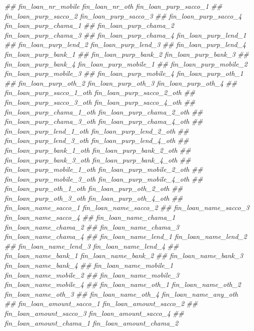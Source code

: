 \documentclass[
]{article}
\newenvironment{Shaded}{\begin{snugshade}}{\end{snugshade}}
\newcommand{\CommentTok}[1]{\textcolor[rgb]{0.56,0.35,0.01}{\textit{#1}}}
\begin{document}
\begin{Shaded}
\begin{Highlighting}[]
\CommentTok{##      fin_loan_nr_mobile fin_loan_nr_oth fin_loan_purp_sacco_1}
\CommentTok{##      fin_loan_purp_sacco_2 fin_loan_purp_sacco_3}
\CommentTok{##      fin_loan_purp_sacco_4 fin_loan_purp_chama_1}
\CommentTok{##      fin_loan_purp_chama_2 fin_loan_purp_chama_3}
\CommentTok{##      fin_loan_purp_chama_4 fin_loan_purp_lend_1}
\CommentTok{##      fin_loan_purp_lend_2 fin_loan_purp_lend_3}
\CommentTok{##      fin_loan_purp_lend_4 fin_loan_purp_bank_1}
\CommentTok{##      fin_loan_purp_bank_2 fin_loan_purp_bank_3}
\CommentTok{##      fin_loan_purp_bank_4 fin_loan_purp_mobile_1}
\CommentTok{##      fin_loan_purp_mobile_2 fin_loan_purp_mobile_3}
\CommentTok{##      fin_loan_purp_mobile_4 fin_loan_purp_oth_1}
\CommentTok{##      fin_loan_purp_oth_2 fin_loan_purp_oth_3 fin_loan_purp_oth_4}
\CommentTok{##      fin_loan_purp_sacco_1_oth fin_loan_purp_sacco_2_oth}
\CommentTok{##      fin_loan_purp_sacco_3_oth fin_loan_purp_sacco_4_oth}
\CommentTok{##      fin_loan_purp_chama_1_oth fin_loan_purp_chama_2_oth}
\CommentTok{##      fin_loan_purp_chama_3_oth fin_loan_purp_chama_4_oth}
\CommentTok{##      fin_loan_purp_lend_1_oth fin_loan_purp_lend_2_oth}
\CommentTok{##      fin_loan_purp_lend_3_oth fin_loan_purp_lend_4_oth}
\CommentTok{##      fin_loan_purp_bank_1_oth fin_loan_purp_bank_2_oth}
\CommentTok{##      fin_loan_purp_bank_3_oth fin_loan_purp_bank_4_oth}
\CommentTok{##      fin_loan_purp_mobile_1_oth fin_loan_purp_mobile_2_oth}
\CommentTok{##      fin_loan_purp_mobile_3_oth fin_loan_purp_mobile_4_oth}
\CommentTok{##      fin_loan_purp_oth_1_oth fin_loan_purp_oth_2_oth}
\CommentTok{##      fin_loan_purp_oth_3_oth fin_loan_purp_oth_4_oth}
\CommentTok{##      fin_loan_name_sacco_1 fin_loan_name_sacco_2}
\CommentTok{##      fin_loan_name_sacco_3 fin_loan_name_sacco_4}
\CommentTok{##      fin_loan_name_chama_1 fin_loan_name_chama_2}
\CommentTok{##      fin_loan_name_chama_3 fin_loan_name_chama_4}
\CommentTok{##      fin_loan_name_lend_1 fin_loan_name_lend_2}
\CommentTok{##      fin_loan_name_lend_3 fin_loan_name_lend_4}
\CommentTok{##      fin_loan_name_bank_1 fin_loan_name_bank_2}
\CommentTok{##      fin_loan_name_bank_3 fin_loan_name_bank_4}
\CommentTok{##      fin_loan_name_mobile_1 fin_loan_name_mobile_2}
\CommentTok{##      fin_loan_name_mobile_3 fin_loan_name_mobile_4}
\CommentTok{##      fin_loan_name_oth_1 fin_loan_name_oth_2 fin_loan_name_oth_3}
\CommentTok{##      fin_loan_name_oth_4 fin_loan_name_any_oth}
\CommentTok{##      fin_loan_amount_sacco_1 fin_loan_amount_sacco_2}
\CommentTok{##      fin_loan_amount_sacco_3 fin_loan_amount_sacco_4}
\CommentTok{##      fin_loan_amount_chama_1 fin_loan_amount_chama_2}

\end{Highlighting}
\end{Shaded}
\end{document}

